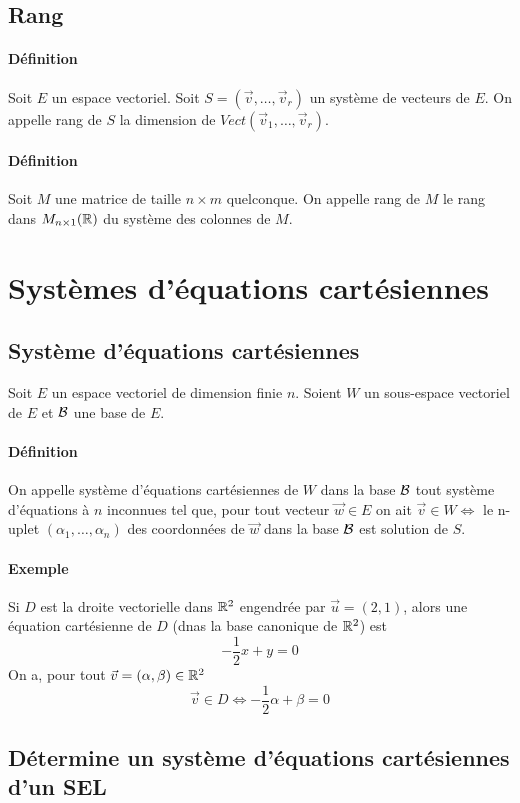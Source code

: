 %
\subsection{Rang}
%
\paragraph{Définition} Soit $E$ un espace vectoriel. Soit $S = (\vec{v}, \ldots, \vec{v}_r)$ un système de vecteurs de $E$. On appelle rang de $S$ la dimension de $Vect(\vec{v}_1, \ldots, \vec{v}_r)$.

\paragraph{Définition} Soit $M$ une matrice de taille $n\times m$ quelconque. On appelle rang de $M$ le rang dans $M_{n\times 1}(\mathbb{R})$ du système des colonnes de $M$.

%
%
\section{Systèmes d'équations cartésiennes} 
%
%

%
\subsection{Système d'équations cartésiennes}
%
Soit $E$ un espace vectoriel de dimension finie $n$. Soient $W$ un sous-espace vectoriel de $E$ et $\mathcal{B}$ une base de $E$.
\paragraph{Définition} On appelle système d'équations cartésiennes de $W$ dans la base $\mathcal{B}$ tout système d'équations à $n$ inconnues tel que, pour tout vecteur $\vec{w} \in E$ on ait $\vec{v} \in W \Leftrightarrow$ le n-uplet $(\alpha_1, \ldots, \alpha_n)$ des coordonnées de $\vec{w}$ dans la base $\mathcal{B}$ est solution de $S$.

\paragraph{Exemple} Si $D$ est la droite vectorielle dans $\mathbb{R}^2$ engendrée par $\vec{u} = (2, 1)$, alors une équation cartésienne de $D$ (dnas la base canonique de $\mathbb{R}^2$) est
$$ - \frac{1}{2} x + y = 0$$
On a, pour tout $\vec{v} = (\alpha, \beta) \in \mathbb{R}^2$ 
$$\vec{v} \in D \Leftrightarrow -\frac{1}{2} \alpha + \beta = 0$$

%
\subsection{Détermine un système d'équations cartésiennes d'un SEL}
%
